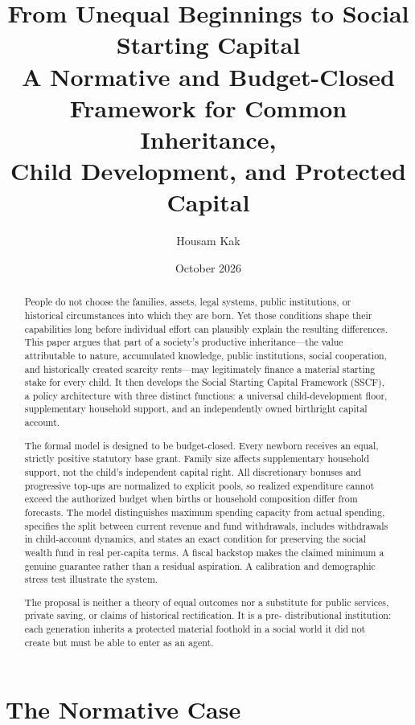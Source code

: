 \documentclass[11pt]{article}
\title{From Unequal Beginnings to Social Starting Capital\\
\large A Normative and Budget-Closed Framework for Common Inheritance,\\
Child Development, and Protected Capital}
\author{Housam Kak}
\date{October 2026}
\begin{document}
\maketitle

\begin{abstract}
People do not choose the families, assets, legal systems, public institutions, or
historical circumstances into which they are born. Yet those conditions shape their
capabilities long before individual effort can plausibly explain the resulting
differences. This paper argues that part of a society's productive inheritance---the
value attributable to nature, accumulated knowledge, public institutions, social
cooperation, and historically created scarcity rents---may legitimately finance a
material starting stake for every child. It then develops the Social Starting Capital
Framework (SSCF), a policy architecture with three distinct functions: a universal
child-development floor, supplementary household support, and an independently owned
birthright capital account.

The formal model is designed to be budget-closed. Every newborn receives an equal,
strictly positive statutory base grant. Family size affects supplementary household
support, not the child's independent capital right. All discretionary bonuses and
progressive top-ups are normalized to explicit pools, so realized expenditure cannot
exceed the authorized budget when births or household composition differ from
forecasts. The model distinguishes maximum spending capacity from actual spending,
specifies the split between current revenue and fund withdrawals, includes withdrawals
in child-account dynamics, and states an exact condition for preserving the social
wealth fund in real per-capita terms. A fiscal backstop makes the claimed minimum a
genuine guarantee rather than a residual aspiration. A calibration and demographic
stress test illustrate the system.

The proposal is neither a theory of equal outcomes nor a substitute for public
services, private saving, or claims of historical rectification. It is a pre-
distributional institution: each generation inherits a protected material foothold in
a social world it did not create but must be able to enter as an agent.
\end{abstract}

\newpage
\tableofcontents
\newpage

\part{The Normative Case}
\end{document}
